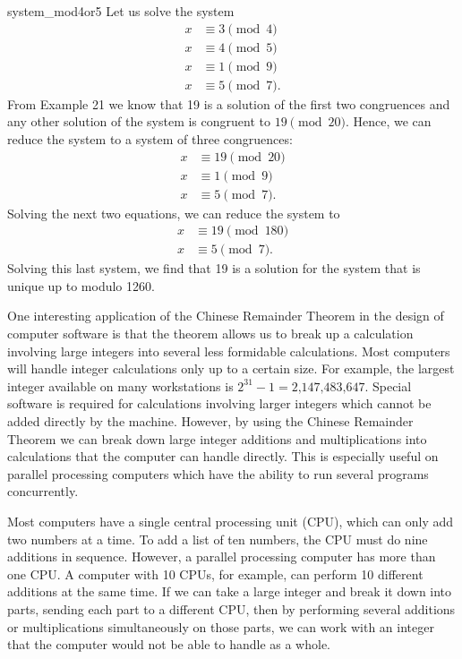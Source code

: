  
\begin{example}{system_mod4or5}
Let us solve the system
\begin{align*}
x & \equiv  3 \pmod{4} \\
x & \equiv  4 \pmod{5} \\
x & \equiv  1 \pmod{9} \\
x & \equiv  5 \pmod{7}. 
\end{align*}
From Example 21 we know that 19 is a solution of the first two
congruences and any other solution of the system is congruent to $19
\pmod{20}$. Hence, we can reduce the system to a system of three 
congruences:
\begin{align*}
x & \equiv  19 \pmod{20} \\
x & \equiv  1 \pmod{9} \\
x & \equiv  5 \pmod{7}. 
\end{align*}
Solving the next two equations, we can reduce the system to
\begin{align*}
x & \equiv  19 \pmod{180} \\
x & \equiv  5 \pmod{7}. 
\end{align*}
Solving this last system, we find that 19 is a solution for the system
that is unique up to modulo 1260.
\end{example}
 
 
One interesting application of the Chinese Remainder Theorem in the
design of computer software is that the theorem allows us to break up
a calculation involving large integers into several less formidable
calculations. Most computers will handle integer calculations only up
to a certain size.  For example, the largest integer available on many
workstations is $2^{31} - 1 = \mbox{2,147,483,647}$.  Special
software is required for calculations involving larger integers which 
cannot be added directly by the machine.  However, by using the Chinese
Remainder Theorem we can break down large integer additions and
multiplications into calculations that the computer can handle
directly. This is especially useful on parallel processing computers
which have the ability to
run several programs concurrently. 
 
Most computers have a single central
processing unit (CPU), which can only add two numbers at a time. To add 
a list of ten numbers, the CPU must do nine additions
in sequence. However, a parallel processing computer has more than
one CPU. A computer with 10 CPUs, for example,  can perform 10
different additions at the same time. If we can take a large integer 
and break
it down into parts, sending each part to a different CPU, then by
performing several additions or multiplications
simultaneously on those parts, we can work with an integer that the
computer would not be able to handle as a whole.  
 
